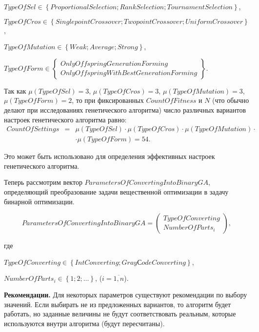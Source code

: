 $ TypeOfSel \in \left\lbrace ProportionalSelection; RankSelection; TournamentSelection\right\rbrace  $,

$ TypeOfCros \in \left\lbrace SinglepointCrossover; TwopointCrossover; UniformCrossover\right\rbrace  $,

$ TypeOfMutation \in \left\lbrace Weak; Average; Strong\right\rbrace  $,

$ TypeOfForm \in \left\lbrace \begin{array}{c} OnlyOffspringGenerationForming \\  OnlyOffspringWithBestGenerationForming
\end{array}\right\rbrace  $.

Так как $ \mu\left( TypeOfSel\right) =3 $, $ \mu\left( TypeOfCros\right)=3 $, $ \mu\left( TypeOfMutation\right)=3 $, $ \mu\left( TypeOfForm\right)=2 $, то при фиксированных $ CountOfFitness $ и $ N $ (что обычно делают при исследованиях генетического алгоритма) число различных вариантов настроек генетического алгоритма равно:
\begin{eqnarray}
\label{StandardGA:eq:CountOfSettings}
CountOfSettings&=& \mu\left( TypeOfSel\right)\cdot \mu\left( TypeOfCros\right) \cdot\mu\left( TypeOfMutation\right)\cdot\\ & & \cdot\mu\left( TypeOfForm\right)=54.\nonumber
\end{eqnarray}

Это может быть использовано для определения эффективных настроек генетического алгоритма.

Теперь рассмотрим вектор $ ParametersOfConvertingIntoBinaryGA $, определяющий преобразование задачи вещественной оптимизации в задачу бинарной оптимизации.

\begin{equation}
\label{StandardGA:eq:ParametersOfConvertingIntoBinaryGA2}
ParametersOfConvertingIntoBinaryGA=  \left( \begin{array}{c} TypeOfConverting  \\ NumberOfParts_i \end{array}\right),
\end{equation}

где

$TypeOfConverting \in \left\lbrace IntConverting; GrayСodeConverting\right\rbrace $,

$NumberOfParts_i \in \left\lbrace 1;2;\ldots\right\rbrace $, ($i=\overline{1,n}$).

\textbf{Рекомендации.} Для некоторых параметров существуют рекомендации по выбору значений. Если выбирать не из предложенных вариантов, то алгоритм будет работать, но заданные величины не будут соответствовать реальным, которые используются внутри алгоритма (будут пересчитаны).

